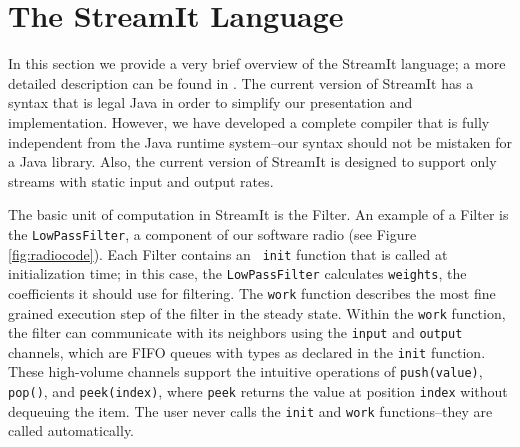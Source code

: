 
\section{The StreamIt Language}
\label{sec:streamit}

In this section we provide a very brief overview of the StreamIt
language; a more detailed description can be found in
\cite{streamitcc}.  The current version of StreamIt has a syntax that
is legal Java in order to simplify our presentation and
implementation.  However, we have developed a complete compiler that
is fully independent from the Java runtime system--our syntax should
not be mistaken for a Java library.  Also, the current version of
StreamIt is designed to support only streams with static input and
output rates.  

The basic unit of computation in StreamIt is the Filter.  An example
of a Filter is the {\tt LowPassFilter}, a component of our software
radio (see Figure \ref{fig:radiocode}).  Each Filter contains an {\tt
init} function that is called at initialization time; in this case,
the {\tt LowPassFilter} calculates {\tt weights}, the coefficients it
should use for filtering.  The {\tt work} function describes the most
fine grained execution step of the filter in the steady state.  Within
the {\tt work} function, the filter can communicate with its neighbors
using the {\tt input} and {\tt output} channels, which are FIFO queues
with types as declared in the {\tt init} function.  These high-volume
channels support the intuitive operations of {\tt push(value)}, {\tt
pop()}, and {\tt peek(index)}, where {\tt peek} returns the value at
position {\tt index} without dequeuing the item.  The user never calls
the {\tt init} and {\tt work} functions--they are called
automatically.


